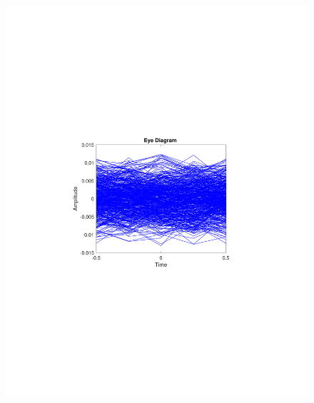 \begin{refsection}
\begin{figure}[H]
\begin{minipage}{0.30\textwidth}
		\includegraphics[clip, trim=4cm 8cm 4cm 8cm, width=1\textwidth]{./sdf/m_qam_system/figures/expResults/homodyne/0_eye_16GBdInSig13dB_bfFec.pdf}
		\label{fig:16GBdSpecBefFecHm}
	\end{minipage}
	\begin{minipage}{0.30\textwidth}
		\centering

\end{minipage}
\end{figure}
\end{refsection}
